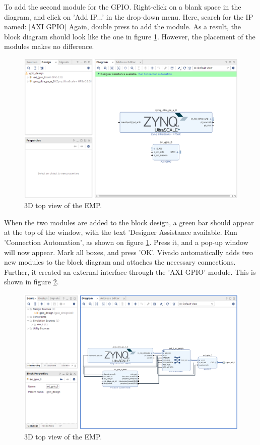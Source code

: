 To add the second module for the GPIO. Right-click on a blank space in the diagram, and click on 'Add IP...' in the drop-down menu. Here, search for the IP named: 
|AXI GPIO|
\noindent Again, double press to add the module. As a result, the block diagram should look like the one in figure \ref{fig:vivado_greenbar}. However, the placement of the modules makes no difference. 

\begin{figure}[H]
    \centering
    \includegraphics[width=1\textwidth]{Graphics/vivado_greenbar.PNG}
    \caption{3D top view of the EMP.}
    \label{fig:vivado_greenbar}
\end{figure}

\noindent When the two modules are added to the block design, a green bar should appear at the top of the window, with the text 'Designer Assistance available. Run 'Connection Automation', as shown on figure \ref{fig:vivado_greenbar}. Press it, and a pop-up window will now appear. Mark all boxes, and press 'OK'. Vivado automatically adds two new modules to the block diagram and attaches the necessary connections. Further, it created an external interface through the 'AXI GPIO'-module. This is shown in figure \ref{fig:vivado_auto}.

\begin{figure}[H]
    \centering
    \includegraphics[width=1\textwidth]{Graphics/vivado_auto.PNG}
    \caption{3D top view of the EMP.}
    \label{fig:vivado_auto}
\end{figure}

